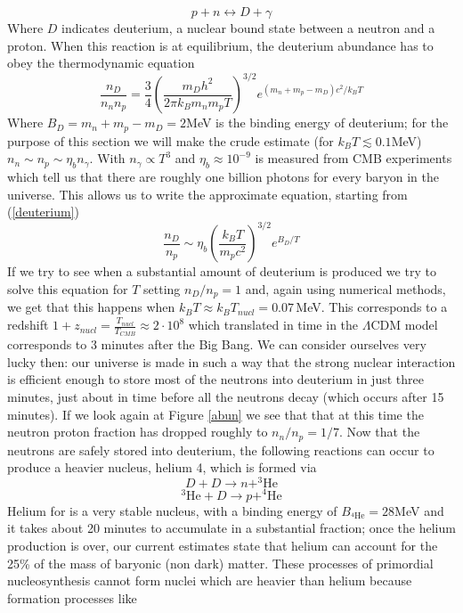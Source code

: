 \begin{equation}
p+n\leftrightarrow D + \gamma
\end{equation}
Where $D$ indicates deuterium, a nuclear bound state between a neutron and a proton. When this reaction is at equilibrium, the deuterium abundance has to obey the thermodynamic equation
\begin{equation}
\label{deuterium}
\frac{n_D}{n_nn_p}=\frac{3}{4}\left(\frac{m_Dh^2}{2\pi k_Bm_nm_p T}\right)^{3/2}e^{(m_n+m_p-m_D)c^2/k_BT}
\end{equation}
Where $B_D=m_n+m_p-m_D=2$MeV is the binding energy of deuterium; for the purpose of this section we will make the crude estimate (for $k_BT\lesssim 0.1$MeV) $n_n\sim n_p \sim\eta_b n_\gamma$. With $n_\gamma \propto T^3$ and $\eta_b\approx 10^{-9}$ is measured from CMB experiments which tell us that there are roughly one billion photons for every baryon in the universe. This allows us to write the approximate equation, starting from (\ref{deuterium})
\begin{equation}
\frac{n_D}{n_p}\sim \eta_b\left(\frac{k_B T}{m_p c^2}\right)^{3/2}e^{B_D/T}
\end{equation}
If we try to see when a substantial amount of deuterium is produced we try to solve this equation for $T$ setting $n_D/n_p=1$ and, again using numerical methods, we get that this happens when $k_B T\approx k_B T_{nucl}=0.07$\,MeV. This corresponds to a redshift $1+z_{nucl}=\frac{T_{nucl}}{T_{CMB}}\approx 2\cdot 10^8$ which translated in time in the $\Lambda$CDM model corresponds to 3 minutes after the Big Bang. We can consider ourselves very lucky then: our universe is made in such a way that the strong nuclear interaction is efficient enough to store most of the neutrons into deuterium in just three minutes, just about in time before all the neutrons decay (which occurs after 15 minutes). If we look again at Figure \ref{abun} we see that that at this time the neutron proton fraction has dropped roughly to $n_n/n_p=1/7$. Now that the neutrons are safely stored into deuterium, the following reactions can occur to produce a heavier nucleus, helium 4, which is formed via
\begin{equation}
D+D \rightarrow n + ^3\mathrm{He}
\end{equation}
\begin{equation}
^3\mathrm{He}+D \rightarrow p + ^4\mathrm{He}
\end{equation}
Helium for is a very stable nucleus, with a binding energy of $B_{^4\mathrm{He}}=28$MeV and it takes about 20 minutes to accumulate in a substantial fraction; once the helium production is over, our current estimates state that helium can account for the 25\% of the mass of baryonic (non dark) matter. These processes of primordial nucleosynthesis cannot form nuclei which are heavier than helium because formation processes like 
